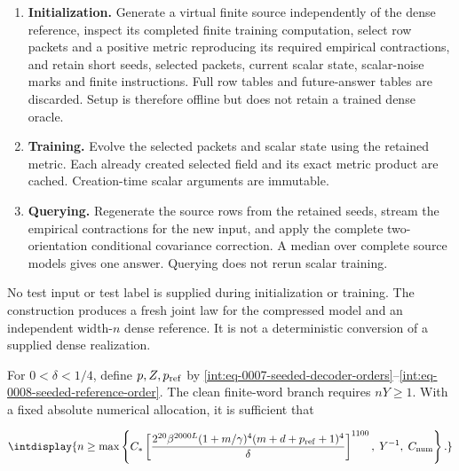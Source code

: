 \begin{enumerate}
\item[1.] \textbf{Initialization.} Generate a virtual finite source independently of the dense reference, inspect its completed finite training computation, select row packets and a positive metric reproducing its required empirical contractions, and retain short seeds, selected packets, current scalar state, scalar-noise marks and finite instructions. Full row tables and future-answer tables are discarded. Setup is therefore offline but does not retain a trained dense oracle.
\item[2.] \textbf{Training.} Evolve the selected packets and scalar state using the retained metric. Each already created selected field and its exact metric product are cached. Creation-time scalar arguments are immutable.
\item[3.] \textbf{Querying.} Regenerate the source rows from the retained seeds, stream the empirical contractions for the new input, and apply the complete two-orientation conditional covariance correction. A median over complete source models gives one answer. Querying does not rerun scalar training.
\end{enumerate}


No test input or test label is supplied during initialization or training. The construction produces a fresh joint law for the compressed model and an independent width-\(n\) dense reference. It is not a deterministic conversion of a supplied dense realization.



For \(0<\delta<1/4\), define \(p,\allowbreak Z,\allowbreak p_{\rm ref}\) by \eqref{int:eq-0007-seeded-decoder-orders}--\allowbreak \eqref{int:eq-0008-seeded-reference-order}. The clean finite-word branch requires \(nY\ge1\). With a fixed absolute numerical allocation, it is sufficient that


\begingroup\renewcommand{\theHequation}{intdisplay.202}
\begin{equation}
\intdisplay{
n\ge\max\left\{
C_*\left[
\frac{2^{20}\beta^{2000L}(1+m/\gamma)^4
(m+d+p_{\rm ref}+1)^4}{\delta}
\right]^{1100},\;Y^{-1},\;C_{\rm num}
\right\}.
}
\label{int:eq-0087-seeded-complete-enclosing-gate}
\end{equation}
\endgroup


